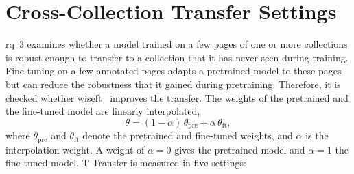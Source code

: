 \FloatBarrier
\section{Cross-Collection Transfer Settings}
\label{sec:meth-transfer}

\Gls{rq}~3 examines whether a model trained on a few pages of one or more collections is robust enough to transfer to a collection that it has never seen during training. Fine-tuning on a few annotated pages adapts a pretrained model to these pages but can reduce the robustness that it gained during pretraining. Therefore, it is checked whether \gls{wiseft}~\cite{wortsman2022wiseft} improves the transfer. The weights of the pretrained and the fine-tuned model are linearly interpolated,
\begin{equation}
    \theta = (1-\alpha)\,\theta_{\mathrm{pre}} + \alpha\,\theta_{\mathrm{ft}},
    \label{eq:wiseft}
\end{equation}
where \(\theta_{\mathrm{pre}}\) and \(\theta_{\mathrm{ft}}\) denote the pretrained and fine-tuned weights, and \(\alpha\) is the interpolation weight. A weight of \(\alpha=0\) gives the pretrained model and \(\alpha=1\) the fine-tuned model. T
Transfer is measured in five settings:
